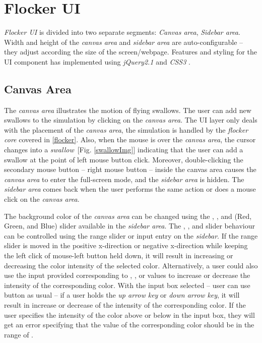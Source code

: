 \documentclass[../main]{subfiles}
\begin{document}
\section{Flocker UI}
\label{flockerUI}

{\em Flocker UI} is divided into two separate segments: {\em Canvas area}, {\em Sidebar area}. Width and height of the {\em canvas area} and {\em sidebar area} are auto-configurable -- they adjust according the size of the screen/webpage.
Features and styling for the UI component has implemented using {\em jQuery2.1} \cite{jquery} and {\em CSS3} \cite{css3}.

\subsection{Canvas Area}
\label{canvasArea}

The {\em canvas area} illustrates the motion of flying swallows. The user can add new swallows to the simulation by clicking on the {\em canvas area}. The UI layer only deals with the placement of the {\em canvas area}, the simulation is handled by the {\em flocker core} covered in \ref{flocker}. Also, when the mouse is over the {\em canvas area}, the cursor changes into a {\em swallow}~[Fig. \ref{swallowImg}] indicating that the user can add a swallow at the point of left mouse button click. Moreover, double-clicking the secondary mouse button -- right mouse button -- inside the canvas area causes the {\em canvas area} to enter the full-screen mode, and the {\em sidebar area} is hidden. The {\em sidebar area} comes back when the user performs the same action or does a mouse click on the {\em canvas area}.

The background color of the {\em canvas area} can be changed using the , , and  (Red, Green, and Blue) slider available in the {\em sidebar area}. The , , and  slider behaviour can be controlled using the range slider or input entry on the {\em sidebar}. If the range slider is moved in the positive x-direction or negative x-direction while keeping the left click of mouse-left button held down, it will result in increasing or decreasing the color intensity of the selected color. Alternatively, a user could also use the input provided corresponding to , , or  values to increase or decrease the intensity of the corresponding color. With the input box selected -- user can use  button as usual -- if a user holds the {\em up arrow key} or {\em down arrow key}, it will result in increase or decrease of the intensity of the corresponding color. If the user specifies the intensity of the color above  or below  in the input box, they will get an error specifying that the value of the corresponding color should be in the range of .
\end{document}
